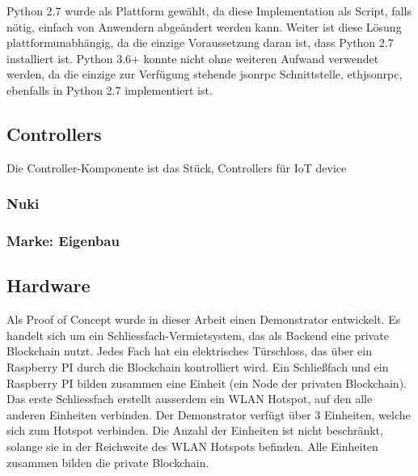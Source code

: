 Python 2.7 wurde als Plattform gewählt, da diese Implementation als Script, falls nötig, einfach von Anwendern abgeändert werden kann. Weiter ist diese Lösung plattformunabhängig, da die einzige Voraussetzung daran ist, dass Python 2.7 installiert ist. Python 3.6+ konnte nicht ohne weiteren Aufwand verwendet werden, da die einzige zur Verfügung stehende jsonrpc Schnittstelle, ethjsonrpc, ebenfalls in Python 2.7 implementiert ist.

\subsection{Controllers}
Die Controller-Komponente ist das Stück, 
Controllers für IoT device
\subsubsection{Nuki}

\subsubsection{Marke: Eigenbau}

\subsection{Hardware}
Als Proof of Concept wurde in dieser Arbeit einen Demonstrator entwickelt. Es handelt sich um ein Schliessfach-Vermietsystem, das als Backend eine private Blockchain nutzt. Jedes Fach hat ein elektrisches Türschloss, das über ein Raspberry PI durch die Blockchain kontrolliert wird. Ein Schließfach und ein Raspberry PI bilden zusammen eine Einheit (ein Node der privaten Blockchain). Das erste Schliessfach erstellt ausserdem ein WLAN Hotspot, auf den alle anderen Einheiten verbinden. Der Demonstrator verfügt über 3 Einheiten, welche sich zum Hotspot verbinden. Die Anzahl der Einheiten ist nicht beschränkt, solange sie in der Reichweite des WLAN Hotspots befinden. Alle Einheiten zusammen bilden die private Blockchain.
